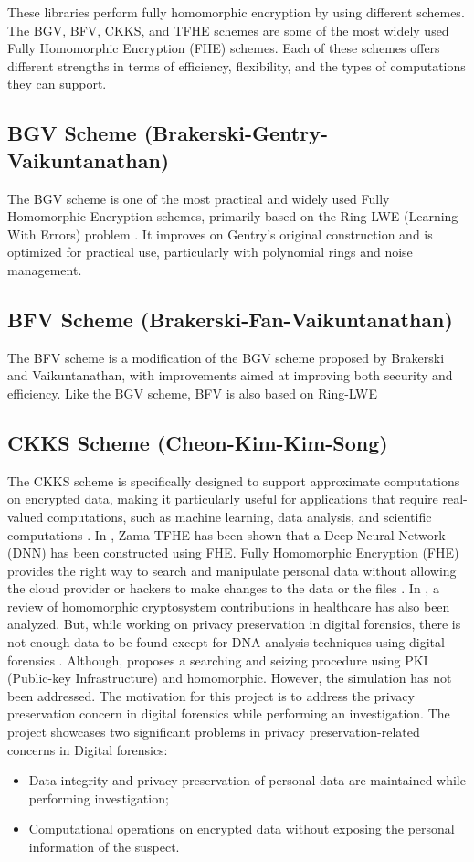 \documentclass[conference]{IEEEtran}
\begin{document}
These libraries perform fully homomorphic encryption by using different schemes. The BGV, BFV, CKKS, and TFHE schemes are some of the most widely used Fully Homomorphic Encryption (FHE) schemes. Each of these schemes offers different strengths in terms of efficiency, flexibility, and the types of computations they can support.
\subsection{\textbf{BGV Scheme (Brakerski-Gentry-Vaikuntanathan)}}
The BGV scheme is one of the most practical and widely used Fully Homomorphic Encryption schemes, primarily based on the Ring-LWE (Learning With Errors) problem \cite{b22}. It improves on Gentry’s original construction and is optimized for practical use, particularly with polynomial rings and noise management.
\subsection{\textbf{BFV Scheme (Brakerski-Fan-Vaikuntanathan)}}
The BFV scheme is a modification of the BGV scheme proposed by Brakerski and Vaikuntanathan, with improvements aimed at improving both security and efficiency. Like the BGV scheme, BFV is also based on Ring-LWE \cite{b23}\cite{b24}\cite{b25}
\subsection{\textbf{CKKS Scheme (Cheon-Kim-Kim-Song)}}
The CKKS scheme is specifically designed to support approximate computations on encrypted data, making it particularly useful for applications that require real-valued computations, such as machine learning, data analysis, and scientific computations \cite{b25}\cite{b26}. 
In \cite{b27}, Zama TFHE has been shown that a Deep Neural Network (DNN) has been constructed using FHE. Fully Homomorphic Encryption (FHE) provides the right way to search and manipulate personal data without allowing the cloud provider or hackers to make changes to the data or the files \cite{b28}. In \cite{b29}, a review of homomorphic cryptosystem contributions in healthcare has also been analyzed. But, while working on privacy preservation in digital forensics, there is not enough data to be found except for DNA analysis techniques using digital forensics \cite{b30}. Although, \cite{b31} proposes a searching and seizing procedure using PKI (Public-key Infrastructure) and homomorphic. However, the simulation has not been addressed. The motivation for this project is to address the privacy preservation concern in digital forensics while performing an investigation. The project showcases two significant problems in privacy preservation-related concerns in Digital forensics: 
\begin{itemize}
    \item Data integrity and privacy preservation of personal data are maintained while performing investigation; 
    \item Computational operations on encrypted data without exposing the personal information of the suspect.
\end{itemize}
\end{document}
